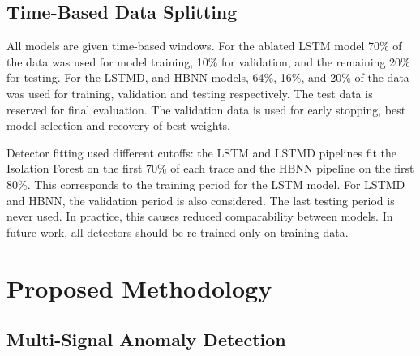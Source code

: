 \documentclass[conference]{IEEEtran}
\begin{document}
\subsection{Time-Based Data Splitting}\label{time-based-data-splitting}

All models are given time-based windows. For the ablated LSTM model 70\% of the data was used for model training, 10\% for validation, and the remaining 20\% for testing. For the LSTMD, and HBNN models, 64\%, 16\%, and 20\% of the data was used for training, validation and testing respectively. The test data is reserved for final evaluation. The validation data is used for early stopping, best model selection and recovery of best weights.

Detector fitting used different cutoffs: the LSTM and LSTMD pipelines fit the
Isolation Forest on the first 70\% of each trace and the HBNN pipeline on the
first 80\%. This corresponds to the training period for the LSTM model. For LSTMD and HBNN, the validation period is also considered. The last testing period is never used. In practice, this causes reduced comparability between models. In future work, all detectors should be re-trained only on training data.

\section{Proposed Methodology}\label{proposed-methodology}

\subsection{Multi-Signal Anomaly Detection}\label{multi-signal-anomaly-detection}
\end{document}
